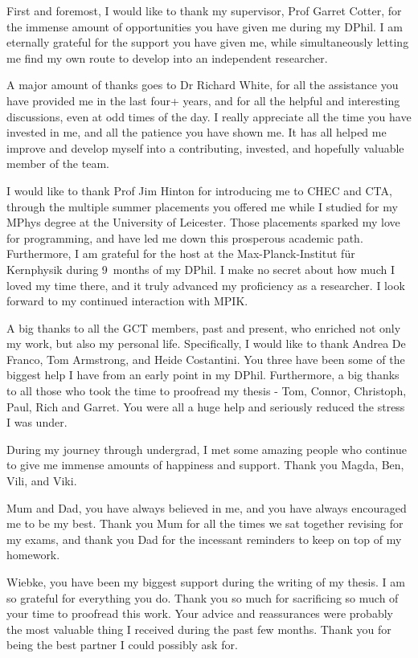 First and foremost, I would like to thank my supervisor, Prof Garret Cotter, for the immense amount of opportunities you have given me during my DPhil. I am eternally grateful for the support you have given me, while simultaneously letting me find my own route to develop into an independent researcher.

A major amount of thanks goes to Dr Richard White, for all the assistance you have provided me in the last four+ years, and for all the helpful and interesting discussions, even at odd times of the day. I really appreciate all the time you have invested in me, and all the patience you have shown me. It has all helped me improve and develop myself into a contributing, invested, and hopefully valuable member of the team.

I would like to thank Prof Jim Hinton for introducing me to CHEC and CTA, through the multiple summer placements you offered me while I studied for my MPhys degree at the University of Leicester. Those placements sparked my love for programming, and have led me down this prosperous academic path. Furthermore, I am grateful for the host at the Max-Planck-Institut für Kernphysik during 9~months of my DPhil. I make no secret about how much I loved my time there, and it truly advanced my proficiency as a researcher. I look forward to my continued interaction with MPIK.

A big thanks to all the GCT members, past and present, who enriched not only my work, but also my personal life. Specifically, I would like to thank Andrea De Franco, Tom Armstrong, and Heide Costantini. You three have been some of the biggest help I have from an early point in my DPhil. Furthermore, a big thanks to all those who took the time to proofread my thesis - Tom, Connor, Christoph, Paul, Rich and Garret. You were all a huge help and seriously reduced the stress I was under.

During my journey through undergrad, I met some amazing people who continue to give me immense amounts of happiness and support. Thank you Magda, Ben, Vili, and Viki. 

Mum and Dad, you have always believed in me, and you have always encouraged me to be my best. Thank you Mum for all the times we sat together revising for my exams, and thank you Dad for the incessant reminders to keep on top of my homework. 

Wiebke, you have been my biggest support during the writing of my thesis. I am so grateful for everything you do. Thank you so much for sacrificing so much of your time to proofread this work. Your advice and reassurances were probably the most valuable thing I received during the past few months. Thank you for being the best partner I could possibly ask for.

